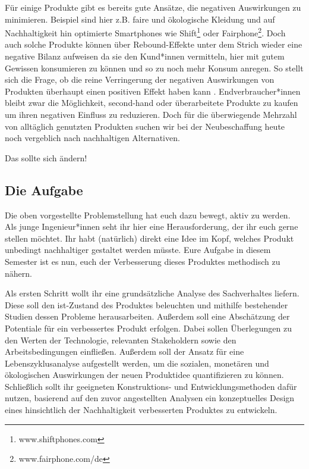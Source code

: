 \documentclass[headinclude=true]{scrartcl}
\begin{document}
Für einige Produkte gibt es bereits gute Ansätze, die negativen Auswirkungen zu minimieren. Beispiel sind hier z.B. faire und ökologische Kleidung und auf Nachhaltigkeit hin optimierte Smartphones wie Shift\footnote{www.shiftphones.com} oder Fairphone\footnote{www.fairphone.com/de}. Doch auch solche Produkte können über Rebound-Effekte unter dem Strich wieder eine negative Bilanz aufweisen da sie den Kund*innen vermitteln, hier mit gutem Gewissen konsumieren zu können und so zu noch mehr Konsum anregen.
So stellt sich die Frage, ob die reine Verringerung der negativen Auswirkungen von Produkten überhaupt einen positiven Effekt haben kann \cite{Carstens.2018, Braungart.2013}.
Endverbraucher*innen bleibt zwar die Möglichkeit, second-hand oder überarbeitete Produkte zu kaufen um ihren negativen Einfluss zu reduzieren. Doch für die überwiegende Mehrzahl von alltäglich genutzten Produkten suchen wir bei der Neubeschaffung heute noch vergeblich nach nachhaltigen Alternativen.

Das sollte sich ändern!

\subsection{Die Aufgabe}

Die oben vorgestellte Problemstellung hat euch dazu bewegt, aktiv zu werden. Als junge Ingenieur*innen seht ihr hier eine Herausforderung, der ihr euch gerne stellen möchtet. 
Ihr habt (natürlich) direkt eine Idee im Kopf, welches Produkt unbedingt nachhaltiger gestaltet werden müsste. Eure Aufgabe in diesem Semester ist es nun, euch der Verbesserung dieses Produktes methodisch zu nähern. 

Als ersten Schritt wollt ihr eine grundsätzliche Analyse des Sachverhaltes liefern. Diese soll den ist-Zustand des Produktes beleuchten und mithilfe bestehender Studien dessen Probleme herausarbeiten. 
Außerdem soll eine Abschätzung der Potentiale für ein verbessertes Produkt erfolgen. Dabei sollen Überlegungen zu den Werten der Technologie, relevanten Stakeholdern sowie den Arbeitsbedingungen einfließen. Außerdem soll der Ansatz für eine Lebenszyklusanalyse aufgestellt werden, um die sozialen, monetären und ökologischen Auswirkungen der neuen Produktidee quantifizieren zu können. 
Schließlich sollt ihr geeigneten Konstruktions- und Entwicklungsmethoden dafür nutzen, basierend auf den zuvor angestellten Analysen ein konzeptuelles Design eines hinsichtlich der Nachhaltigkeit verbesserten Produktes zu entwickeln. 
\end{document}
